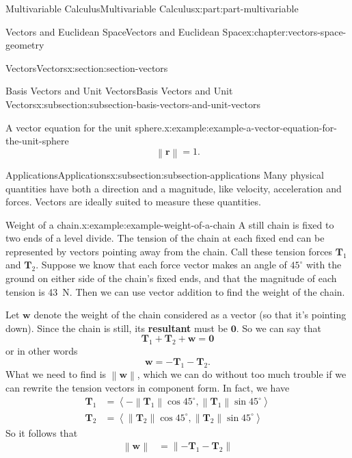 \documentclass[twoside,10pt,]{book}
\newcommand{\terminology}[1]{\textbf{#1}}
\numberwithin{equation}{part}
\newcommand{\norm}[1]{\left\| #1 \right\|}
\newcommand{\dotprod}[1]{\left\langle #1 \right\rangle}
\begin{document}
\begin{partptx}{Multivariable Calculus}{}{Multivariable Calculus}{}{}{x:part:part-multivariable}
\begin{chapterptx}{Vectors and Euclidean Space}{}{Vectors and Euclidean Space}{}{}{x:chapter:vectors-space-geometry}
\begin{sectionptx}{Vectors}{}{Vectors}{}{}{x:section:section-vectors}
\begin{subsectionptx}{Basis Vectors and Unit Vectors}{}{Basis Vectors and Unit Vectors}{}{}{x:subsection:subsection-basis-vectors-and-unit-vectors}
\begin{example}{A vector equation for the unit sphere.}{x:example:example-a-vector-equation-for-the-unit-sphere}
\begin{equation*}
\norm{\mathbf{r}} = 1.
\end{equation*}
\end{example}
%
\end{subsectionptx}
%
%
\typeout{************************************************}
\typeout{************************************************}
%
\begin{subsectionptx}{Applications}{}{Applications}{}{}{x:subsection:subsection-applications}
Many physical quantities have both a direction and a magnitude, like velocity, acceleration and forces. Vectors are ideally suited to measure these quantities.%
\begin{example}{Weight of a chain.}{x:example:example-weight-of-a-chain}%
A still chain is fixed to two ends of a level divide. The tension of the chain at each fixed end can be represented by vectors pointing away from the chain. Call these tension forces \(\mathbf{T}_{1}\) and \(\mathbf{T}_{2}\). Suppose we know that each force vector makes an angle of \(45^{\circ}\) with the ground on either side of the chain's fixed ends, and that the magnitude of each tension is \SI{43}{\newton}. Then we can use vector addition to find the weight of the chain.%
\par
Let \(\mathbf{w}\) denote the weight of the chain considered as a vector (so that it's pointing down). Since the chain is still, its \terminology{resultant}\footnotemark{} must be \(\mathbf{0}\). So we can say that%
%
\begin{equation*}
\mathbf{T}_{1}+\mathbf{T}_{2} + \mathbf{w} = \mathbf{0}
\end{equation*}
or in other words%
%
\begin{equation*}
\mathbf{w} = -\mathbf{T}_{1}-\mathbf{T}_{2}.
\end{equation*}
What we need to find is \(\norm{\mathbf{w}}\), which we can do without too much trouble if we can rewrite the tension vectors in component form. In fact, we have%
%
\begin{align*}
\mathbf{T}_{1} & = \dotprod{-\norm{\mathbf{T}_{1}}\cos45^{\circ},\norm{\mathbf{T}_{1}}\sin45^{\circ}} \\
\mathbf{T}_{2} & = \dotprod{\norm{\mathbf{T}_{2}}\cos45^{\circ},\norm{\mathbf{T}_{2}}\sin45^{\circ}} 
\end{align*}
So it follows that%
%
\begin{align*}
\norm{\mathbf{w}} & = \norm{-\mathbf{T}_{1}-\mathbf{T}_{2}} \\

\end{align*}
\end{example}
\end{subsectionptx}
\end{sectionptx}
\end{chapterptx}
\end{partptx}
\end{document}
